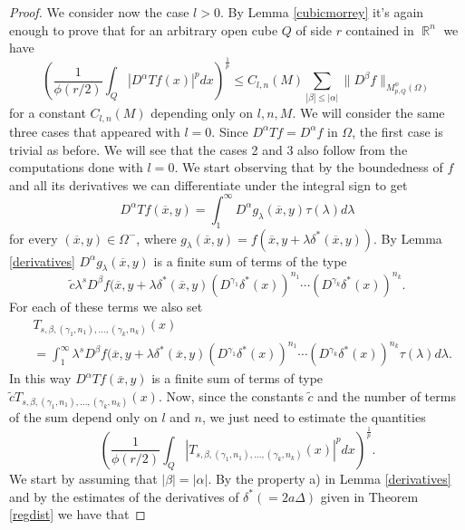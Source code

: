 \documentclass[12pt]{article}
\theoremstyle{definition}
\DeclareMathOperator\rr{\mathbb{R}}
\begin{document}
\begin{proof}
We consider now the case $l>0.$ By Lemma \ref{cubicmorrey} it's again enough to prove that for an arbitrary open cube $Q$ of side $r$ contained in $\rr^n$ we have
\begin{equation}
\left(\frac{1}{\phi(r/2)}\int_Q |D^\alpha Tf(x)|^pdx \right)^{\frac{1}{p}} \le C_{l,n}(M) \sum_{|\beta| \le |\alpha|}\| D^\beta f\|_{M_{p,Q}^\phi(\Omega)}
\end{equation}
for a constant $C_{l,n}(M)$ depending only on $l,n,M$. We will consider the same three cases that appeared with $l=0$. Since $D^\alpha Tf=D^\alpha f$ in $\Omega$, the first case is trivial as before. We will see that the cases 2 and 3 also follow from the computations done with $l=0$. We start observing that by the boundedness of $f$ and all its derivatives we can differentiate under the integral sign to get
\[D^\alpha Tf(\overline x,y)= \int_1^\infty D^\alpha g_\lambda(\overline x,y) \tau(\lambda) d\lambda\]
for every $(\overline x, y) \in \Omega^-$, where $g_\lambda(\overline x,y)=f(\overline x, y+\lambda \delta^*(\overline x, y))$. By Lemma \ref{derivatives} $D^\alpha g_\lambda(\overline x,y)$ is a finite sum of terms of the type 
\[ \widetilde c\lambda ^s D^\beta f(\overline x, y+\lambda \delta^*(\overline x, y)(D^{\gamma_1}\delta^*(x))^{n_1}\cdots (D^{\gamma_k}\delta^*(x))^{n_k}.\]
For each of these terms we also set
\begin{align*}
 &T_{s,\beta,(\gamma_1,n_1),...,(\gamma_k,n_k)}(x) \\
 &= \int_1^\infty \lambda ^s D^\beta f(\overline x, y+\lambda \delta^*(\overline x, y)(D^{\gamma_1}\delta^*(x))^{n_1}\cdots (D^{\gamma_k}\delta^*(x))^{n_k} \tau(\lambda) d\lambda.
 \end{align*}
In this way $D^\alpha Tf(\overline x,y)$ is a finite sum of terms of type $\widetilde c T_{s,\beta,(\gamma_1,n_1),...,(\gamma_k,n_k)}(x)$. Now, since the constants $\widetilde c$ and the number of terms of the sum depend only on $l$ and $n$, we just need to estimate the quantities
\[\left( \frac{1}{\phi(r/2)}\int_Q  \left| T_{s,\beta,(\gamma_1,n_1),...,(\gamma_k,n_k)}(x)\right|^p dx\right )^{\frac{1}{p}}.\]
We start by assuming that $|\beta|=|\alpha|.$ By the property a) in Lemma \ref{derivatives} and by the estimates of the derivatives of $\delta^*(=2a\Delta)$ given in Theorem \ref{regdist} we have that


\end{proof}
\end{document}
